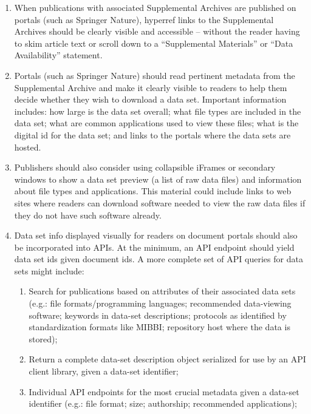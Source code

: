 \documentclass[11pt,letterpaper]{article}
\newcommand{\q}[1]{{\fontfamily{qcr}\selectfont ``}#1{\fontfamily{qcr}\selectfont ''}}
\begin{document}
{{\begin{enumerate}
\item{}  When publications with associated Supplemental Archives are published on portals (such as Springer Nature), hyperref links to the Supplemental Archives should be clearly visible and accessible -- without the reader having to skim article text or scroll down to a \q{Supplemental Materials} or \q{Data Availability} statement.

\item{}  Portals (such as Springer Nature) should read pertinent metadata from the Supplemental Archive and make it clearly visible to readers to help them decide whether they wish to download a data set.  Important information includes: how large is the data set overall; what file types are included in the data set; what are common applications used to view these files; what is the digital id for the data set; and links to the portals where the data sets are hosted.

\item{}  Publishers should also consider using collapsible iFrames or secondary windows to show a data set preview (a list of raw data files) and information about file types and applications.  This material could include links to web sites where readers can download software needed to view the raw data files if they do not have such software already.

\item{}  Data set info displayed visually for readers on document portals should also be incorporated into APIs.  At the minimum, an API endpoint should yield data set ids given document ids.  A more complete set of API queries for data sets might include:

\begin{enumerate}
\item{}  Search for publications based on attributes of their associated data sets (e.g.: file formats/programming languages; recommended data-viewing software; keywords in data-set descriptions; protocols as identified by standardization formats like MIBBI; repository host where the data is stored);

\item{}  Return a complete data-set description object serialized for use by an API client library, given a data-set identifier;

\item{}  Individual API endpoints for the most crucial metadata given a data-set identifier (e.g.: file format; size; authorship; recommended applications);


\end{enumerate}
\end{enumerate}}}
\end{document}
